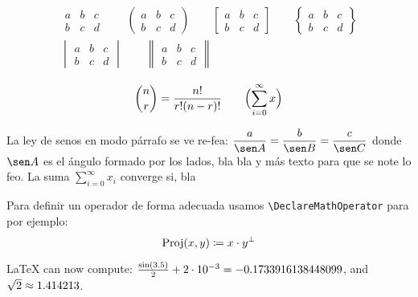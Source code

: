 \begin{gather*}
  \begin{matrix}
    a & b & c \\
    b & c & d
  \end{matrix}\qquad
  \begin{pmatrix}
    a & b & c \\
    b & c & d
  \end{pmatrix}\qquad
  \begin{bmatrix}
    a & b & c \\
    b & c & d
  \end{bmatrix}\qquad 
  \begin{Bmatrix}
    a & b & c \\
    b & c & d
  \end{Bmatrix}\\[10pt]
  \begin{vmatrix}
    a & b & c \\
    b & c & d
  \end{vmatrix}\qquad  
  \begin{Vmatrix}
    a & b & c \\
    b & c & d
  \end{Vmatrix}\qquad
\end{gather*}


\begin{equation*}
\binom{n}{r} = \frac{n!}{r!(n-r)!}\qquad
\Bigl(\sum_{i=0}^{\infty} x \Bigr)
\end{equation*}

La ley de senos en modo párrafo se ve re-fea: $\displaystyle{\frac{a}{\sen A} =\frac{b}{\sen B} = \frac{c}{\sen C}}$ donde $\sen A$ es el ángulo formado por los lados, bla bla y más texto para que se note lo feo. La suma $\sum_{i=0}^{\infty} x_i$ converge si, bla

Para definir un operador de forma adecuada usamos \verb+\DeclareMathOperator+ para por ejemplo:
\begin{equation*}
  \operatorname{Proj}(x,y) \coloneq x\cdot y^\perp
\end{equation*}

\LaTeX{} can now compute: $ \frac{\sin (3.5)}{2} + 2\cdot 10^{-3}
  = \fpeval{sin(3.5)/2 + 2e-3} $, and $\sqrt{2} \approx \fpeval{trunc(sqrt(2),6)}$.

\endinput